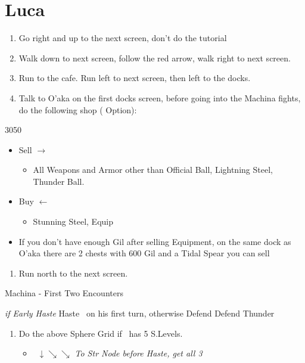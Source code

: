 \chapter{Luca}

\begin{enumerate}
    \item Go right and up to the next screen, don't do the tutorial
    \item Walk down to next screen, follow the red arrow, walk right to next screen.
    \item Run to the cafe. Run left to next screen, then left to the docks.
    \item Talk to O'aka on the first docks screen, before going into the Machina fights, do the following shop ( Option):
\end{enumerate}
\begin{shop}{3050}
    \begin{itemize}
        \item Sell $\rightarrow$
        \begin{itemize}
            \item All Weapons and Armor other than Official Ball, Lightning Steel, Thunder Ball.
        \end{itemize}
        \item Buy $\leftarrow$
        \begin{itemize}
            \item Stunning Steel, Equip
        \end{itemize}
        \item If you don't have enough Gil after selling Equipment, on the same dock as O'aka there are 2 chests with 600 Gil and a Tidal Spear you can sell
    \end{itemize}
\end{shop}
\begin{enumerate}[resume]
    \item Run north to the next screen.
\end{enumerate}
\begin{battle}{Machina - First Two Encounters}
    \begin{itemize}
        \tidusf \textit{if Early Haste} Haste \lulu\ on his first turn, otherwise Defend
        \kimahrif Defend
        \luluf Thunder
    \end{itemize}
\end{battle}
\begin{enumerate}[resume]
    \item Do the above Sphere Grid if \tidus\ has 5 S.Levels.
    \begin{itemize}
        \item \tidus\ $\downarrow \searrow \searrow$ \textit{To Str Node before Haste, get all 3}
    \end{itemize}
\end{enumerate}
